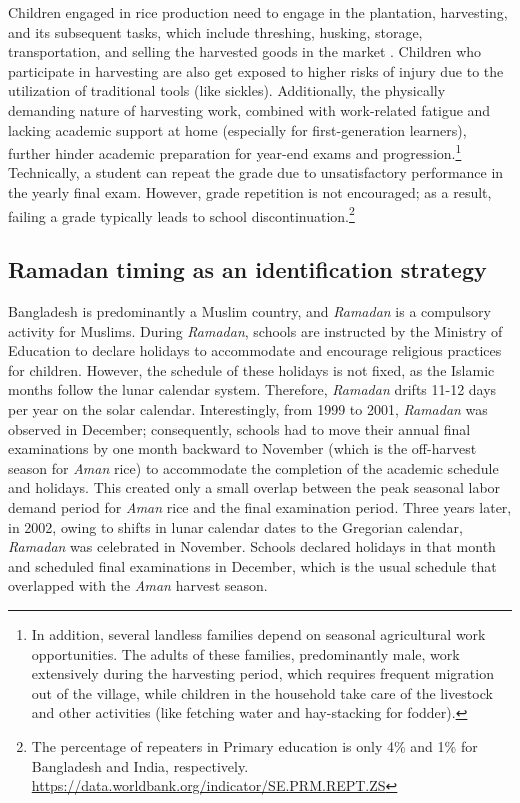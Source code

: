 \documentclass[12pt,letterpaper]{article}
\newcommand{\0}{\ensuremath{\mbox{\boldmath $0$}}}
\begin{document}
Children engaged in rice production need to engage in the plantation, harvesting, and its subsequent tasks, which include threshing, husking, storage, transportation, and selling the harvested goods in the market \citep{chowdhury2009participatory}. Children who participate in harvesting are also get exposed to higher risks of injury due to the utilization of traditional tools (like sickles). Additionally, the physically demanding nature of harvesting work, combined with work-related fatigue and lacking academic support at home (especially for first-generation learners), further hinder academic preparation for year-end exams and progression.\footnote{In addition, several landless families depend on seasonal agricultural work opportunities. The adults of these families, predominantly male, work extensively during the harvesting period, which requires frequent migration out of the village, while children in the household take care of the livestock and other activities (like fetching water and hay-stacking for fodder).} Technically, a student can repeat the grade due to unsatisfactory performance in the yearly final exam. However, grade repetition is not encouraged; as a result, failing a grade typically leads to school discontinuation.\footnote{The percentage of repeaters in Primary education is only 4\% and 1\% for Bangladesh and India, respectively. \url{https://data.worldbank.org/indicator/SE.PRM.REPT.ZS}}


\subsection{Ramadan timing as an identification strategy}

Bangladesh is predominantly a Muslim country, and \textit{Ramadan} is a compulsory activity for Muslims. During \textit{Ramadan}, schools are instructed by the Ministry of Education to declare holidays to accommodate and encourage religious practices for children. However, the schedule of these holidays is not fixed, as the Islamic months follow the lunar calendar system. Therefore, \textit{Ramadan} drifts 11-12 days per year on the solar calendar. Interestingly, from 1999 to 2001, \textit{Ramadan} was observed in December; consequently, schools had to move their annual final examinations by one month backward to November (which is the off-harvest season for \textit{Aman} rice) to accommodate the completion of the academic schedule and holidays. This created only a small overlap between the peak seasonal labor demand period for \textit{Aman} rice and the final examination period. Three years later, in 2002, owing to shifts in lunar calendar dates to the Gregorian calendar, \textit{Ramadan} was celebrated in November. Schools declared holidays in that month and scheduled final examinations in December, which is the usual schedule that overlapped with the \textit{Aman} harvest season. 
\end{document}
